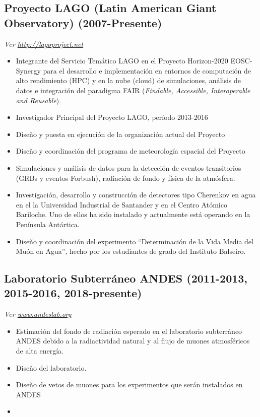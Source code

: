 \subsection*{Proyecto LAGO (Latin American Giant Observatory) (2007-Presente)}
{\small{\textit{Ver \href{http://lagoproject.net}{http://lagoproject.net}}}}
\begin{itemize}

\item Integrante del Servicio Temático LAGO en el Proyecto Horizon-2020 EOSC-Synergy para el desarrollo e implementación en entornos de computación de alto rendimiento (HPC) y en la nube (cloud) de simulaciones, análisis de datos e integración del paradigma FAIR (\emph{Findable, Accessible, Interoperable and Reusable}).
\item Investigador Principal del Proyecto LAGO, período 2013-2016
\item Diseño y puesta en ejecución de la organización actual del Proyecto
\item Diseño y coordinación del programa de meteorología espacial del Proyecto
\item Simulaciones y análisis de datos para la detección de eventos transitorios (GRBs y eventos Forbush), radiación de fondo y física de la atmósfera.
\item Investigación, desarrollo y construcción de detectores tipo Cherenkov en agua en el la Universidad Industrial de Santander y en el Centro Atómico Bariloche. Uno de ellos ha sido instalado y actualmente está operando en la Península Antártica.
\item Diseño y coordinación del experimento ``Determinación de la Vida Media del Muón en Agua'', hecho por los estudiantes de grado del Instituto Balseiro.
\end{itemize}
\subsection*{Laboratorio Subterráneo ANDES (2011-2013, 2015-2016, 2018-presente)}
{\small{\textit{Ver \href{http://www.andeslab.org}{www.andeslab.org}}}}
\begin{itemize}
\item Estimación del fondo de radiación esperado en el laboratorio subterráneo ANDES debido a la radiactividad natural y al flujo de muones atmosféricos de alta energía.
\item Diseño del laboratorio.
\item Diseño de vetos de muones para los experimentos que serán instalados en ANDES
\item \end{itemize}

